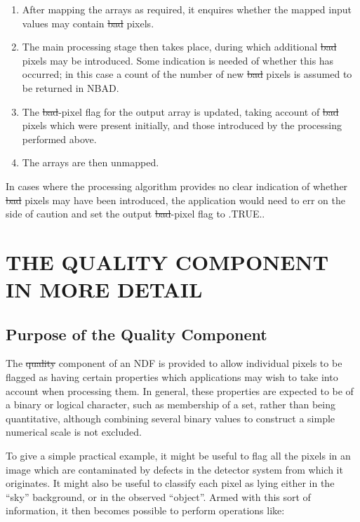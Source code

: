 \begin{enumerate}

\item
After mapping the arrays as required, it enquires whether the mapped input
values may contain \st{bad\/} pixels. 

\item
The main processing stage then takes place, during which additional
\st{bad\/} pixels may be introduced.  
Some indication is needed of whether this has occurred; in this case a count
of the number of new \st{bad\/} pixels is assumed to be returned in NBAD. 

\item
The \st{bad\/}-pixel flag for the output array is updated, taking account of
\st{bad\/} pixels which were present initially, and those introduced by the
processing performed above. 

\item
The arrays are then unmapped.

\end{enumerate}

In cases where the processing algorithm provides no clear indication of
whether \st{bad\/} pixels may have been introduced, the application would need
to err on the side of caution and set the output \st{bad\/}-pixel flag to
.TRUE.. 


\section{THE QUALITY COMPONENT IN MORE DETAIL}

\subsection{Purpose of the Quality Component}

The \st{quality\/} component of an NDF is provided to allow individual pixels
to be flagged as having certain properties which applications may wish to take
into account when processing them. 
In general, these properties are expected to be of a binary or logical
character, such as membership of a set, rather than being quantitative, 
although combining several binary values to construct a simple numerical 
scale is not excluded.

To give a simple practical example, it might be useful to flag all the
pixels in an image which are contaminated by defects in the detector system
from which it originates. 
It might also be useful to classify each pixel as lying either in the 
``sky'' background, or in the observed ``object''.
Armed with this sort of information, it then becomes possible to perform 
operations like:

